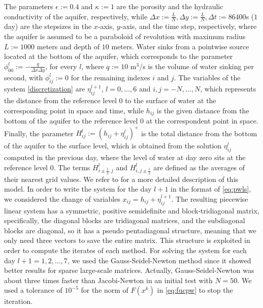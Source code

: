 \documentclass[11pt]{article}
\begin{document}
The parameters $\epsilon:=0.4$ and $\kappa:=1$ are the porosity and the hydraulic conductivity of the aquifer, respectively, while $\Delta x:=\frac{L}{N}, \Delta y:=\frac{L}{N}, \Delta t:=86400$s ($1$ day) are the stepsizes in the $x$-axis, $y$-axis, and the time step, respectively, where the aquifer is assumed to be a paraboloid of revolution with maximum radius $L:=1000$ meters and depth of $10$ meters. Water sinks from a pointwise source located at the bottom of the aquifer, which corresponds to the parameter $\phi_{00}^l := -\frac{q}{\Delta x \Delta y}$, for every $l$, where $q:=10$ m$^3$/s is the volume of water sinking per second, with $\phi_{ij}^l:=0$ for the remaining indexes $i$ and $j$. The variables of the system \eqref{discretization} are $\eta_{ij}^{l+1}$, $l=0,\dots,6$ and $i,j = -N,\dots, N$, which represents the distance from the reference level $0$ to the surface of water at the corresponding point in space and time, while $h_{ij}$ is the given distance from the bottom of the aquifer to the reference level $0$ at the correspondent point in space. Finally, the parameter $H^l_{ij}:=(h_{ij}+\eta^l_{ij})^+$ is the total distance from the bottom of the aquifer to the surface level, which is obtained from the solution $\eta^l_{ij}$ computed in the previous day, where the level of water at day zero sits at the reference level $0$. The terms $H^l_{i\pm\frac{1}{2},j}$ and $H^l_{i,j\pm\frac{1}{2}}$ are defined as the averages of their nearest grid values. We refer to \cite{Brugnano2008} for a more detailed description of this model. In order to write the system for the day $l+1$ in the format of \eqref{eq:pwls}, we considered the change of variables $x_{ij} = h_{ij}+\eta_{ij}^{l+1}$. %
 The resulting piecewise linear system has a symmetric, positive semidefinite and block-tridiagonal matrix, specifically, the diagonal blocks are tridiagonal matrices, and the subdiagonal blocks are diagonal, so it has a pseudo pentadiagonal structure, meaning that we only need three vectors to save the entire matrix. This structure is exploited in order to compute the iterates of each method. For solving the system for each day $l+1=1,2,\ldots,7$, we used the Gauss-Seidel-Newton method since it showed better results for sparse large-scale matrices. Actually, Gauss-Seidel-Newton was about three times faster than Jacobi-Newton in an initial test with $N=50$. We used a tolerance of $10^{-5}$ for the norm of $F(x^k)$ in \eqref{eq:fucpw} to stop the iteration.
\end{document}
